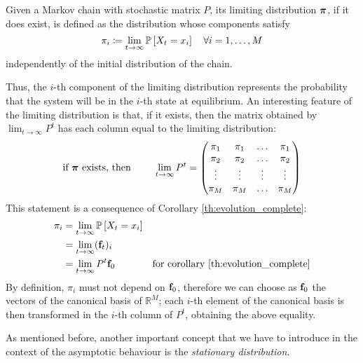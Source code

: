 \begin{ndef}
    Given a Markov chain with stochastic matrix $P$, its limiting distribution $\boldsymbol{\pi}$, if it does exist, is defined as the distribution whose components satisfy
    \begin{equation}
        \pi_i \coloneqq \lim_{t \rightarrow \infty} \mathbb{P}\left[X_t = x_i\right] \quad \forall i=1,\dots,M
    \end{equation}
    independently of the initial distribution of the chain.
\end{ndef}
Thus, the $i$-th component of the limiting distribution represents the probability that the system will be in the $i$-th state at equilibrium. An interesting feature of the limiting distribution is that, if it exists, then the matrix obtained by $\lim_{t \rightarrow \infty} P^t$ has each column equal to the limiting distribution:
\begin{equation}
    \text{if $\boldsymbol{\pi}$ exists, then } \quad \quad \lim_{t \rightarrow \infty} P^t =
    \begin{pmatrix}
        \pi_1  & \pi_1  & \dots  & \pi_1  \\
        \pi_2  & \pi_2  & \dots  & \pi_2  \\
        \vdots & \vdots & \vdots & \vdots \\
        \pi_M  & \pi_M  & \dots  & \pi_M
    \end{pmatrix}
\end{equation}
This statement is a consequence of Corollary \ref{th:evolution_complete}:
    \begin{align}
        \pi_i
         & = \lim_{t \rightarrow \infty} \mathbb{P}\left[X_t = x_i\right]                                                       \\
         & = \lim_{t \rightarrow \infty} (\mathbf{f}_t)_i                                                               \\
         & = \lim_{t \rightarrow \infty} P^t \mathbf{f}_0         & \text{for corollary \ref{th:evolution_complete}}
    \end{align}   
By definition, $\pi_i$ must not depend on $\mathbf{f}_0$, therefore we can choose as $\mathbf{f}_0$ the vectors of the canonical basis of $\mathbb{R}^M$; each $i$-th element of the canonical basis is then transformed in the $i$-th column of $P^t$, obtaining the above equality.

\medskip
As mentioned before, another important concept that we have to introduce in the context of the asymptotic behaviour is the \emph{stationary distribution}.

